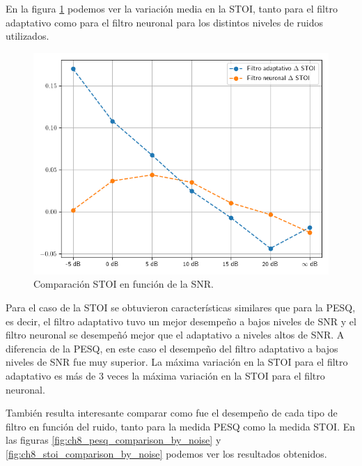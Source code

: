 En la figura \ref{fig:ch8_stoi_comparison} podemos ver la variación media en la STOI, tanto para el filtro adaptativo como para el filtro neuronal para los distintos niveles de ruidos utilizados.

\begin{figure}
	\centering
	\centerline{\includegraphics[scale=0.75]{images/ch8/comparison_stoi.png}}
	\caption{Comparación STOI en función de la SNR.}
	\label{fig:ch8_stoi_comparison}
\end{figure}

Para el caso de la STOI se obtuvieron características similares que para la PESQ, es decir, el filtro adaptativo tuvo un mejor desempeño a bajos niveles de SNR y el filtro neuronal se desempeñó mejor que el adaptativo a niveles altos de SNR. A diferencia de la PESQ, en este caso el desempeño del filtro adaptativo a bajos niveles de SNR fue muy superior. La máxima variación en la STOI para el filtro adaptativo es más de 3 veces la máxima variación en la STOI para el filtro neuronal.

También resulta interesante comparar como fue el desempeño de cada tipo de filtro en función del ruido, tanto para la medida PESQ como la medida STOI. En las figuras \ref{fig:ch8_pesq_comparison_by_noise} y \ref{fig:ch8_stoi_comparison_by_noise} podemos ver los resultados obtenidos.

